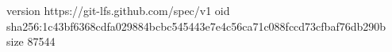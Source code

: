 version https://git-lfs.github.com/spec/v1
oid sha256:1c43bf6368cdfa029884bcbc545443e7e4c56ca71c088fccd73cfbaf76db290b
size 87544
